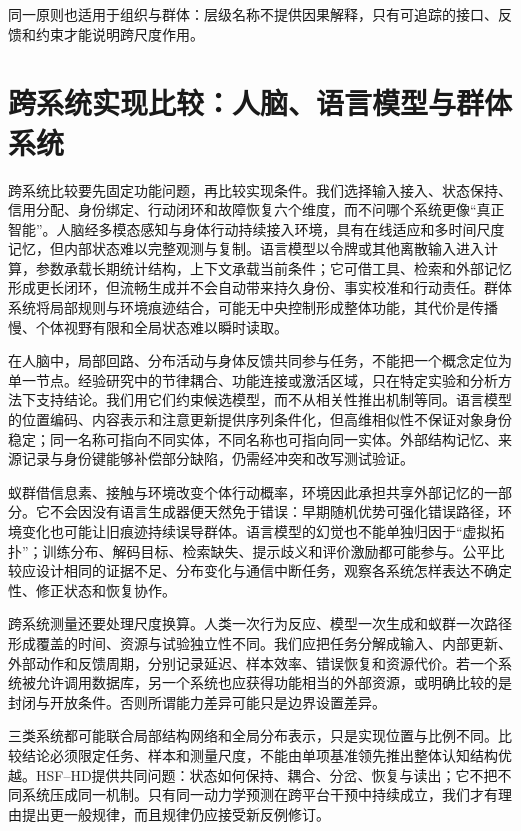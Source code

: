 同一原则也适用于组织与群体：层级名称不提供因果解释，只有可追踪的接口、反馈和约束才能说明跨尺度作用。

\section{跨系统实现比较：人脑、语言模型与群体系统}
\label{sec:cross_scale_holographic_anatomy}

跨系统比较要先固定功能问题，再比较实现条件。我们选择输入接入、状态保持、信用分配、身份绑定、行动闭环和故障恢复六个维度，而不问哪个系统更像“真正智能”。人脑经多模态感知与身体行动持续接入环境，具有在线适应和多时间尺度记忆，但内部状态难以完整观测与复制。语言模型以令牌或其他离散输入进入计算，参数承载长期统计结构，上下文承载当前条件；它可借工具、检索和外部记忆形成更长闭环，但流畅生成并不会自动带来持久身份、事实校准和行动责任。群体系统将局部规则与环境痕迹结合，可能无中央控制形成整体功能，其代价是传播慢、个体视野有限和全局状态难以瞬时读取。

在人脑中，局部回路、分布活动与身体反馈共同参与任务，不能把一个概念定位为单一节点。经验研究中的节律耦合、功能连接或激活区域，只在特定实验和分析方法下支持结论。我们用它们约束候选模型，而不从相关性推出机制等同。语言模型的位置编码、内容表示和注意更新提供序列条件化，但高维相似性不保证对象身份稳定；同一名称可指向不同实体，不同名称也可指向同一实体。外部结构记忆、来源记录与身份键能够补偿部分缺陷，仍需经冲突和改写测试验证。

蚁群借信息素、接触与环境改变个体行动概率，环境因此承担共享外部记忆的一部分。它不会因没有语言生成器便天然免于错误：早期随机优势可强化错误路径，环境变化也可能让旧痕迹持续误导群体。语言模型的幻觉也不能单独归因于“虚拟拓扑”；训练分布、解码目标、检索缺失、提示歧义和评价激励都可能参与。公平比较应设计相同的证据不足、分布变化与通信中断任务，观察各系统怎样表达不确定性、修正状态和恢复协作。

跨系统测量还要处理尺度换算。人类一次行为反应、模型一次生成和蚁群一次路径形成覆盖的时间、资源与试验独立性不同。我们应把任务分解成输入、内部更新、外部动作和反馈周期，分别记录延迟、样本效率、错误恢复和资源代价。若一个系统被允许调用数据库，另一个系统也应获得功能相当的外部资源，或明确比较的是封闭与开放条件。否则所谓能力差异可能只是边界设置差异。

三类系统都可能联合局部结构网络和全局分布表示，只是实现位置与比例不同。比较结论必须限定任务、样本和测量尺度，不能由单项基准领先推出整体认知结构优越。HSF--HD提供共同问题：状态如何保持、耦合、分岔、恢复与读出；它不把不同系统压成同一机制。只有同一动力学预测在跨平台干预中持续成立，我们才有理由提出更一般规律，而且规律仍应接受新反例修订。


